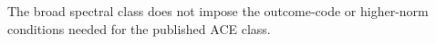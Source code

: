 The broad spectral class does not impose the outcome-code or higher-norm conditions needed for the published ACE class.